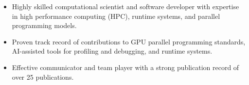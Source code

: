 
\selectfont
\begin{itemize}
    \item Highly skilled computational scientist and software developer with expertise in high performance computing (HPC), runtime systems, and parallel programming models. 
    \item Proven track record of contributions to GPU parallel programming standards, AI-assisted tools for profiling and debugging, and runtime systems. 
    \item Effective communicator and team player with a strong publication record of over 25 publications. 
\end{itemize}
